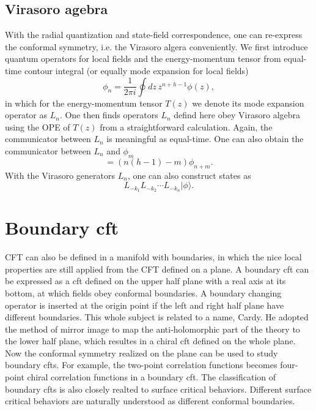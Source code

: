 \documentclass[submission, PhysLectNotes]{SciPost}
\begin{document}
\subsection{Virasoro agebra}
With the radial quantization and state-field correspondence, one can re-express the conformal symmetry, i.e. the Virasoro algera conveniently.  We first introduce quantum operators for local fields and the energy-momentum tensor from equal-time contour integral (or equally mode expansion for local fields)
\begin{equation}
	\phi_n = \frac{1}{2\pi i}\oint dz \, z^{n+h-1} \phi(z),
\end{equation}
in which for the energy-momentum tensor $T(z)$ we denote its mode expansion operator as $L_n$. One then finds operators $L_n$ defind here obey Virasoro algebra using the OPE of $T(z)$ from a straightforward calculation. Again, the communicator between $L_n$ is meaningful as equal-time. One can also obtain the communicator between $L_n$ and $\phi_m$ 
\begin{equation}
	[L_n, \phi_m] = \left(n(h-1)-m\right) \phi_{n+m}.
\end{equation}
With the Virasoro generators $L_n$, one can also construct states as 
\begin{equation}
L_{-k_1}L_{-k_2} \cdots L_{-k_n} \vert \phi \rangle.
\end{equation}

\section{Boundary cft}
CFT can also be defined in a manifold with boundaries, in which the nice local properties are still applied from the CFT defined on a plane. A boundary cft can be expressed as a cft defined on the upper half plane with a real axis at its bottom, at which fields obey conformal boundaries. A boundary changing operator is inserted at the origin point if the left and right half plane have different boundaries. This whole subject is related to a name, Cardy. He adopted the method of mirror image to map the anti-holomorphic part of the theory to the lower half plane, which resultes in a chiral cft defined on the whole plane.  Now the conformal symmetry realized on the plane can be used to study boundary cfts. For example, the two-point correlation functions becomes four-point chiral correlation functions in a boundary cft. The classification of boundary cfts is also closely realted to surface critical behaviors. Different surface critical behaviors are naturally understood as different conformal boundaries. 
\end{document}
